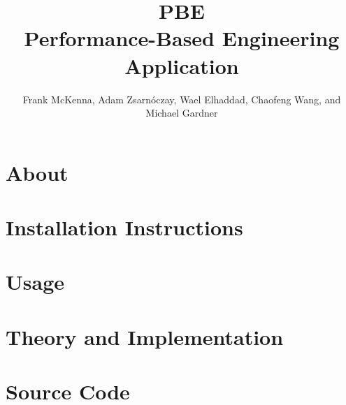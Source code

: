 \documentclass{simcenterdocumentation}
\begin{document}
\title{PBE\\ Performance-Based Engineering Application}
\author{Frank McKenna, Adam Zsarn\'oczay, Wael Elhaddad, Chaofeng Wang, and Michael Gardner}

\hypersetup{pageanchor=false}
\maketitle
\copyrightpage
\acknowledgments

\hypersetup{pageanchor=true}
\begin{frontmatter}

\pagestyle{plain}
{
  \renewcommand{\thispagestyle}[1]{}
  \tableofcontents
  \clearpage
  \listoffigures
  \clearpage
  \listoftables
}

\end{frontmatter}
\pagestyle{somewhatsimple}

\chapter{About}
\label{chap:about}


\chapter{Installation Instructions}
\label{chap:installation}


\chapter{Usage}
\label{chap:usage}


\chapter{Theory and Implementation}
\label{chap:theory}


\chapter{Source Code}
\label{chap:SourceCode}

\end{document}
